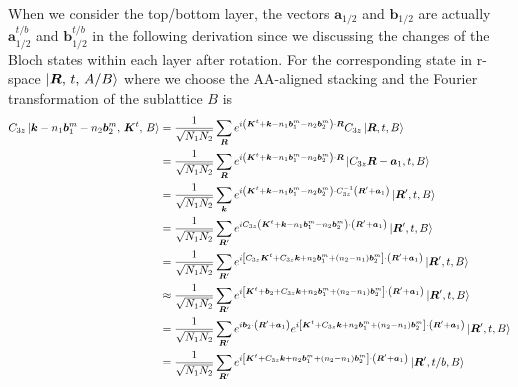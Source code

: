 \documentclass[10pt, oneside]{article}
\newcommand{\p}[1]{\left(#1\right)}
\newcommand{\bb}[1]{\left[#1\right]}
\begin{document}
When we consider the top/bottom layer, the vectors \(\bm{a}_{1/2}\) and \(\bm{b}_{1/2}\) are actually \(\bm{a}^{t/b}_{1/2}\) and \(\bm{b}^{t/b}_{1/2}\) in the following derivation since we discussing the changes of the Bloch states within each layer after rotation. For the corresponding state in r-space \(\ket{\bm{R},\, t,\, A/B}\) where we choose the AA-aligned stacking and the Fourier transformation of the sublattice \(B\) is 
\begin{align}
	\begin{split}
		C_{3z} \ket{\bm{k} - n_{1} \bm{b}^{m}_{1} - n_{2} \bm{b}^{m}_{2}, \, \bm{K}^{t},\, B} & = \frac{1}{\sqrt{N_{1} N_{2}}} \sum_{\bm{R}} e^{i \p{\bm{K}^{t} + \bm{k} -n_{1} \bm{b}^{m}_{1} - n_{2} \bm{b}^{m}_{2}} \cdot \bm{R}} C_{3z} \ket{\bm{R}, t, B} \\
		& = \frac{1}{\sqrt{N_{1} N_{2}}} \sum_{\bm{R}} e^{i \p{\bm{K}^{t} + \bm{k} -n_{1} \bm{b}^{m}_{1} - n_{2} \bm{b}^{m}_{2}} \cdot \bm{R}} \ket{ C_{3z} \bm{R} - \bm{a}_{1}, t, B} \\
		& = \frac{1}{\sqrt{N_{1} N_{2}}} \sum_{\bm{k}} e^{i \p{\bm{K}^{t} + \bm{k} -n_{1} \bm{b}^{m}_{1} - n_{2} \bm{b}^{m}_{2}} \cdot C^{-1}_{3z} \p{\bm{R}^{\prime} + \bm{a}_{1}}} \ket{ \bm{R}^{\prime}, t, B} \\
		& = \frac{1}{\sqrt{N_{1} N_{2}}} \sum_{\bm{R}^\prime} e^{i C_{3z} \p{\bm{K}^{t} + \bm{k} -n_{1} \bm{b}^{m}_{1} - n_{2} \bm{b}^{m}_{2}} \cdot \p{\bm{R}^{\prime} + \bm{a}_{1}}} \ket{ \bm{R}^{\prime}, t, B} \\
		& = \frac{1}{\sqrt{N_{1} N_{2}}} \sum_{\bm{R}^\prime} e^{i \bb{C_{3z} \bm{K}^{t} + C_{3z} \bm{k} + n_{2} \bm{b}^{m}_{1} + \p{n_{2} - n_{1}} \bm{b}^{m}_{2}} \cdot \p{\bm{R}^{\prime} + \bm{a}_{1}}} \ket{ \bm{R}^{\prime}, t, B} \\
		& \approx  \frac{1}{\sqrt{N_{1} N_{2}}} \sum_{\bm{R}^\prime} e^{i \bb{\bm{K}^{t} + \bm{b}_{2} + C_{3z} \bm{k} + n_{2} \bm{b}^{m}_{1} + \p{n_{2} - n_{1}} \bm{b}^{m}_{2}} \cdot \p{\bm{R}^{\prime} + \bm{a}_{1}}} \ket{ \bm{R}^{\prime}, t, B} \\
		& = \frac{1}{\sqrt{N_{1} N_{2}}} \sum_{\bm{R}^\prime} e^{i \bm{b}_{2} \cdot \p{\bm{R}^{\prime} + \bm{a}_{1}}} e^{i \bb{\bm{K}^{t} + C_{3z} \bm{k} + n_{2} \bm{b}^{m}_{1} + \p{n_{2} - n_{1}} \bm{b}^{m}_{2}} \cdot \p{\bm{R}^{\prime} + \bm{a}_{1}}} \ket{ \bm{R}^{\prime}, t, B} \\
		& = \frac{1}{\sqrt{N_{1} N_{2}}} \sum_{\bm{R}^\prime} e^{i \bb{\bm{K}^{t} + C_{3z} \bm{k} + n_{2} \bm{b}^{m}_{1} + \p{n_{2} - n_{1}} \bm{b}^{m}_{2}} \cdot \p{\bm{R}^{\prime} + \bm{a}_{1}}} \ket{ \bm{R}^{\prime}, t/b, B} \\

\end{split}
\end{align}
\end{document}
